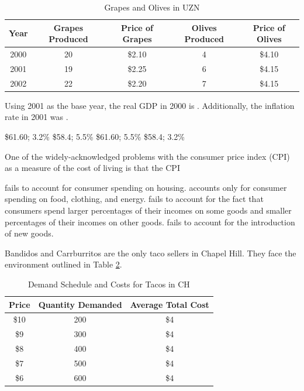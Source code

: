 \documentclass[addpoints,11pt]{exam}
\theoremstyle{definition}
\newcommand{\blank}[0]{\underline{\hspace{3cm}}}
\begin{document}
\begin{questions}
\begin{table}[H]
	\caption{Grapes and Olives in UZN}
	\centering
	\begin{tabular}{c|c|c|c|c}
		Year & Grapes Produced & Price of Grapes & Olives Produced & Price of Olives \\
		\hline
		2000 & 20 & \$2.10 & 4 & \$4.10\\
		2001 & 19 & \$2.25 & 6 & \$4.15\\
		2002 & 22 & \$2.20 & 7 & \$4.15\\
	\end{tabular} 
	\label{MC23}
\end{table}

Using 2001 as the base year, the real GDP in 2000 is \blank. Additionally, the inflation rate in 2001 was \blank.


\begin{choices}
	\choice \$61.60; 3.2\%
	\choice \$58.4; 5.5\%
	\CorrectChoice \$61.60; 5.5\%
	\choice \$58.4; 3.2\%
\end{choices}


	
	\question One of the widely-acknowledged problems with the consumer price index (CPI) as a measure of the cost of living is that the CPI
	
	\begin{choices}
		\choice fails to account for consumer spending on housing.
		\choice accounts only for consumer spending on food, clothing, and energy.
		\choice fails to account for the fact that consumers spend larger percentages of their incomes on some goods and smaller percentages of their incomes on other goods.
		\CorrectChoice fails to account for the introduction of new goods.
	\end{choices}
	
	
	\question Bandidos and Carrburritos are the only taco sellers in Chapel Hill. They face the environment outlined in Table \ref{MC24}. 
	
	\begin{table}[H]
		\caption{Demand Schedule and Costs for Tacos in CH}
		\centering
		\begin{tabular}{c|c|c}
			Price & Quantity Demanded & Average Total Cost \\
			\hline
			\$10 & 200 & \$4\\
			\$9 & 300 & \$4\\
			\$8 & 400 & \$4 \\
			\$7 & 500 & \$4 \\
			\$6 & 600 & \$4 \\
		\end{tabular} 
		\label{MC24}
	\end{table}
	

\end{questions}
\end{document}
